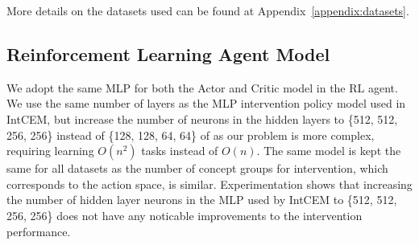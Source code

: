 \documentclass[../main.tex]{subfiles}
\begin{document}
More details on the datasets used can be found at Appendix~\ref{appendix:datasets}.

\subsection{Reinforcement Learning Agent Model}
We adopt the same MLP for 
both the Actor and Critic model in the RL agent. 
We use the same number of layers as the MLP intervention policy
 model used in IntCEM, but increase the number of neurons in the hidden layers
 to \{512, 512, 256, 256\} instead of \{128, 128, 64, 64\}
 of as 
 our problem is more complex, requiring 
 learning $O(n^2)$ tasks instead of $O(n)$.
 The same model is kept 
 the same for all datasets as the number of concept groups for intervention,
 which corresponds to the action space,
 is similar. Experimentation shows that increasing the number of hidden layer neurons
 in the MLP used by 
 IntCEM to \{512, 512, 256, 256\} does not have any noticable improvements
 to the intervention performance.
\end{document}
